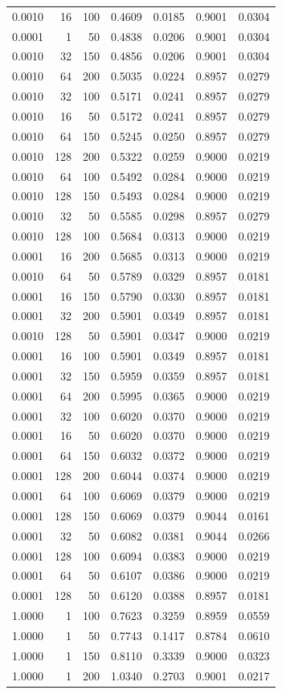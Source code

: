 \begin{tabular}{rrrrrrr}
0.0010 & 16 & 100 & 0.4609 & 0.0185 & 0.9001 & 0.0304 \\
0.0001 & 1 & 50 & 0.4838 & 0.0206 & 0.9001 & 0.0304 \\
0.0010 & 32 & 150 & 0.4856 & 0.0206 & 0.9001 & 0.0304 \\
0.0010 & 64 & 200 & 0.5035 & 0.0224 & 0.8957 & 0.0279 \\
0.0010 & 32 & 100 & 0.5171 & 0.0241 & 0.8957 & 0.0279 \\
0.0010 & 16 & 50 & 0.5172 & 0.0241 & 0.8957 & 0.0279 \\
0.0010 & 64 & 150 & 0.5245 & 0.0250 & 0.8957 & 0.0279 \\
0.0010 & 128 & 200 & 0.5322 & 0.0259 & 0.9000 & 0.0219 \\
0.0010 & 64 & 100 & 0.5492 & 0.0284 & 0.9000 & 0.0219 \\
0.0010 & 128 & 150 & 0.5493 & 0.0284 & 0.9000 & 0.0219 \\
0.0010 & 32 & 50 & 0.5585 & 0.0298 & 0.8957 & 0.0279 \\
0.0010 & 128 & 100 & 0.5684 & 0.0313 & 0.9000 & 0.0219 \\
0.0001 & 16 & 200 & 0.5685 & 0.0313 & 0.9000 & 0.0219 \\
0.0010 & 64 & 50 & 0.5789 & 0.0329 & 0.8957 & 0.0181 \\
0.0001 & 16 & 150 & 0.5790 & 0.0330 & 0.8957 & 0.0181 \\
0.0001 & 32 & 200 & 0.5901 & 0.0349 & 0.8957 & 0.0181 \\
0.0010 & 128 & 50 & 0.5901 & 0.0347 & 0.9000 & 0.0219 \\
0.0001 & 16 & 100 & 0.5901 & 0.0349 & 0.8957 & 0.0181 \\
0.0001 & 32 & 150 & 0.5959 & 0.0359 & 0.8957 & 0.0181 \\
0.0001 & 64 & 200 & 0.5995 & 0.0365 & 0.9000 & 0.0219 \\
0.0001 & 32 & 100 & 0.6020 & 0.0370 & 0.9000 & 0.0219 \\
0.0001 & 16 & 50 & 0.6020 & 0.0370 & 0.9000 & 0.0219 \\
0.0001 & 64 & 150 & 0.6032 & 0.0372 & 0.9000 & 0.0219 \\
0.0001 & 128 & 200 & 0.6044 & 0.0374 & 0.9000 & 0.0219 \\
0.0001 & 64 & 100 & 0.6069 & 0.0379 & 0.9000 & 0.0219 \\
0.0001 & 128 & 150 & 0.6069 & 0.0379 & 0.9044 & 0.0161 \\
0.0001 & 32 & 50 & 0.6082 & 0.0381 & 0.9044 & 0.0266 \\
0.0001 & 128 & 100 & 0.6094 & 0.0383 & 0.9000 & 0.0219 \\
0.0001 & 64 & 50 & 0.6107 & 0.0386 & 0.9000 & 0.0219 \\
0.0001 & 128 & 50 & 0.6120 & 0.0388 & 0.8957 & 0.0181 \\
1.0000 & 1 & 100 & 0.7623 & 0.3259 & 0.8959 & 0.0559 \\
1.0000 & 1 & 50 & 0.7743 & 0.1417 & 0.8784 & 0.0610 \\
1.0000 & 1 & 150 & 0.8110 & 0.3339 & 0.9000 & 0.0323 \\
1.0000 & 1 & 200 & 1.0340 & 0.2703 & 0.9001 & 0.0217 \\
\bottomrule
\end{tabular}
